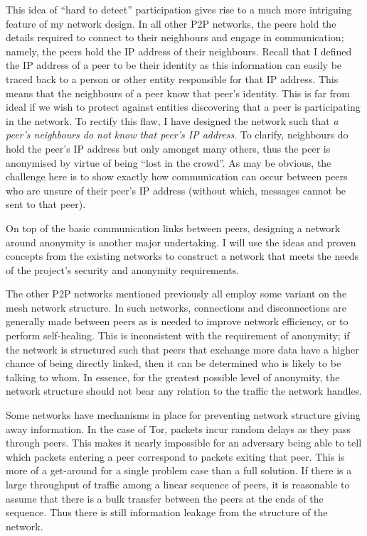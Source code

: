 \documentclass[ %
                    author={Luke Murray},
                supervisor={Dr. Simon Hollis},
                     title={Shadow Peer-to-Peer Networks},
                  subtitle={},
                    degree={MEng},
                      year={2013} ]{thesis}
\begin{document}
This idea of ``hard to detect'' participation gives rise to a much more intriguing feature of my network design. In all other P2P networks, the peers hold the details required to connect to their neighbours and engage in communication; namely, the peers hold the IP address of their neighbours. Recall that I defined the IP address of a peer to be their identity as this information can easily be traced back to a person or other entity responsible for that IP address. This means that the neighbours of a peer know that peer's identity. This is far from ideal if we wish to protect against entities discovering that a peer is participating in the network. To rectify this flaw, I have designed the network such that {\em a peer's neighbours do not know that peer's IP address}. To clarify, neighbours do hold the peer's IP address but only amongst many others, thus the peer is anonymised by virtue of being ``lost in the crowd''. As may be obvious, the challenge here is to show exactly how communication can occur between peers who are unsure of their peer's IP address (without which, messages cannot be sent to that peer).

On top of the basic communication links between peers, designing a network around anonymity is another major undertaking. I will use the ideas and proven concepts from the existing networks to construct a network that meets the needs of the project's security and anonymity requirements.

The other P2P networks mentioned previously all employ some variant on the mesh network structure. In such networks, connections and disconnections are generally made between peers as is needed to improve network efficiency, or to perform self-healing. This is inconsistent with the requirement of anonymity; if the network is structured such that peers that exchange more data have a higher chance of being directly linked, then it can be determined who is likely to be talking to whom. In essence, for the greatest possible level of anonymity, the network structure should not bear any relation to the traffic the network handles.

Some networks have mechanisms in place for preventing network structure giving away information. In the case of Tor, packets incur random delays as they pass through peers. This makes it nearly impossible for an adversary being able to tell which packets entering a peer correspond to packets exiting that peer. This is more of a get-around for a single problem case than a full solution. If there is a large throughput of traffic among a linear sequence of peers, it is reasonable to assume that there is a bulk transfer between the peers at the ends of the sequence. Thus there is still information leakage from the structure of the network.
\end{document}
